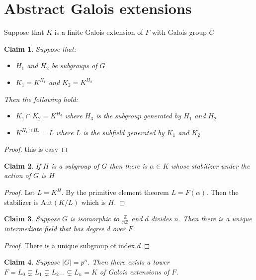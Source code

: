 \documentclass{article}
\newtheorem{claim}{Claim}
\begin{document}
\section{Abstract Galois extensions}

Suppose that $K$ is a finite Galois extension of $F$ with Galois group $G$

\begin{claim}
  Suppose that:
  \begin{itemize}
    \item $H_1$ and $H_2$ be subgroups of $G$
    \item $K_1=K^{H_1}$ and $K_2=K^{H_2}$
  \end{itemize}

  Then the following hold:
  \begin{itemize}
    \item $K_1 \cap K_2 = K^{H_3}$ where $H_3$ is the subgroup generated by $H_1$ and $H_2$
    \item $K^{H_1 \cap H_2} = L$ where $L$ is the subfield generated by $K_1$ and $K_2$
  \end{itemize}
\end{claim}

\begin{proof}
  this is easy
\end{proof}

\begin{claim}
  If $H$ is a subgroup of $G$ then there is $\alpha \in K$ whose stabilizer under the action of $G$ is $H$
\end{claim}

\begin{proof}
  Let $L=K^H$. By the primitive element theorem $L=F(\alpha)$. Then the stabilizer is $\text{Aut}(K/L)$ which is $H$.
\end{proof}

\begin{claim}
  Suppose $G$ is isomorphic to $\frac{\mathbb{Z}}{n\mathbb{Z}}$ and $d$ divides $n$. Then there is a unique intermediate field that has degree $d$ over $F$
\end{claim}

\begin{proof}
  There is a unique subgroup of index $d$
\end{proof}

\begin{claim}
  Suppose $|G|=p^n$. Then there exists a tower $F =  L_0 \subsetneq L_1 \subsetneq L_2 \dots \subsetneq L_n = K$ of Galois extensions of $F$.
\end{claim}
\end{document}
